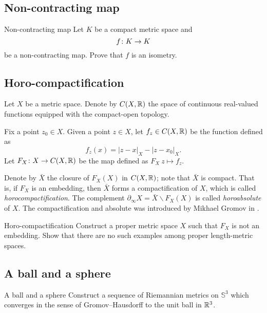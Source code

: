 \subsection*{Non-contracting map\easy}

\begin{pr}{\easy}{Non-contracting map}\label{Noncontracting map}
Let $K$  be a compact metric space and
\[f\:K\z\to K\] 
be a non-contracting map.
Prove that $f$ is an isometry.
\end{pr}


\subsection*{Horo-compactification\easy}

Let $X$ be a metric space.
Denote by $C(X,\mathbb{R})$ the space of continuous real-valued functions
equipped with the compact-open topology.

Fix a point $z_0\in X$.
Given a point $z\in X$, let $f_z\in C(X,\mathbb{R})$ be the function defined as 
\[f_z(x)=|z-x|_X-|z-x_0|_X.\]
Let $F_X\colon X\to C(X,\mathbb{R})$ be the map 
defined as $F_X\:z\mapsto f_z$.

Denote by $\bar X$ 
the closure of $F_X(X)$ in $C(X,\mathbb{R})$;
note that $\bar X$ is compact.
That is, 
if $F_X$ is an embedding, 
then $\bar X$ forms a compactification of $X$,
which is called \emph{horocompactification}.
The complement 
$\partial_\infty X=\bar X\backslash F_X(X)$ 
is called {}\emph{horoabsolute} of $X$.
The compactification
and absolute
was introduced by Mikhael Gromov in \cite{gromov-hyperbolic}.


\begin{pr}{\easy}{Horo-compactification}\label{Horo-compactification}
Construct a proper metric space $X$
such that $F_X$ is not an embedding.
Show that there are no such examples among proper length-metric spaces.
\end{pr}

\subsection*{A ball and a sphere}

\begin{pr}{}{A ball and a sphere}\label{3-sphere is close to a ball}
Construct a sequence of Riemannian metrics on $\mathbb{S}^3$ 
which converges in the sense of Gromov--Hausdorff 
to the unit ball in $\mathbb{R}^3$.
\end{pr}

